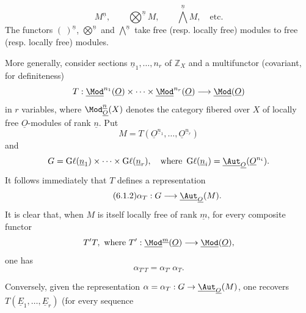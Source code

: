%

\begin{equation}\tag{6.1.1}
 M^{\underline{n}},\qquad \bigotimes^{\underline{n}} M,\qquad \bigwedge^{\underline{n}} M,\quad\text{etc.}
\end{equation}
The functors \((\ )^{\underline{n}}\), \(\bigotimes\limits^{\underline{n}}\) and \(\bigwedge\limits^{\underline{n}}\) take free (resp. locally free) modules to free (resp. locally free) modules.

More generally, consider sections \(\underline{n}_1,\ldots,n_r\) of \(\mathbb Z_X\) and a multifunctor (covariant, for definiteness)
\[
 T:\underline{\Mod}^{n_1}(\underline{O})\times\cdots\times
 \underline{\Mod}^{n_r}(\underline{O})\longrightarrow\underline{\Mod}(\underline{O})
\]
in \(r\) variables, where \(\Mod_{\underline{O}}^{\underline{n}}(X)\) denotes the category fibered over \(X\) of locally free \(\underline{O}\)-modules of rank \(\underline{n}\). Put
\[
 M=T(\underline{O}^{\underline{n}_1},\ldots,\underline{O}^{\underline{n}_r})
\]
and
\[
 G=\operatorname{G\ell}(\underline{n}_1)\times\cdots\times\operatorname{G\ell}(\underline{n}_r),
 \quad\text{where }\operatorname{G\ell}(\underline{n}_i)=\underline{\Aut}_{\underline{O}}(\underline{O}^{n_i}).
\]
It follows immediately that \(T\) defines a representation
\begin{equation}\tag{6.1.2}
 \alpha_T:G\longrightarrow\underline{\Aut}_{\underline{O}}(M).
\end{equation}
It is clear that, when \(M\) is itself locally free of rank \(\underline{m}\), for every composite functor
\[
 T'T,\ \text{where } T':\underline{\Mod}^{\underline{m}}(\underline{O})\longrightarrow\underline{\Mod}(\underline{O}),
\]
one has
\begin{equation}\tag{6.1.3}
 \alpha_{T'T}=\alpha_{T'}\,\alpha_T.
\end{equation}

Conversely, given the representation \(\alpha=\alpha_T:G\to\underline{\Aut}_{\underline{O}}(M)\), one recovers \(T(\underline{E}_1,\ldots,\underline{E}_r)\) (for every sequence

%

